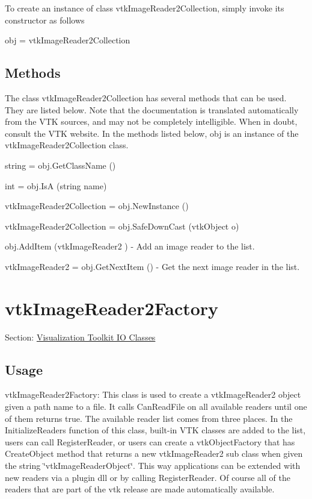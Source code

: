 To create an instance of class vtk\-Image\-Reader2\-Collection, simply invoke its constructor as follows \begin{DoxyVerb}  obj = vtkImageReader2Collection
\end{DoxyVerb}
 \hypertarget{vtkwidgets_vtkxyplotwidget_Methods}{}\subsection{Methods}\label{vtkwidgets_vtkxyplotwidget_Methods}
The class vtk\-Image\-Reader2\-Collection has several methods that can be used. They are listed below. Note that the documentation is translated automatically from the V\-T\-K sources, and may not be completely intelligible. When in doubt, consult the V\-T\-K website. In the methods listed below, {\ttfamily obj} is an instance of the vtk\-Image\-Reader2\-Collection class. 
\begin{DoxyItemize}
\item {\ttfamily string = obj.\-Get\-Class\-Name ()}  
\item {\ttfamily int = obj.\-Is\-A (string name)}  
\item {\ttfamily vtk\-Image\-Reader2\-Collection = obj.\-New\-Instance ()}  
\item {\ttfamily vtk\-Image\-Reader2\-Collection = obj.\-Safe\-Down\-Cast (vtk\-Object o)}  
\item {\ttfamily obj.\-Add\-Item (vtk\-Image\-Reader2 )} -\/ Add an image reader to the list.  
\item {\ttfamily vtk\-Image\-Reader2 = obj.\-Get\-Next\-Item ()} -\/ Get the next image reader in the list.  
\end{DoxyItemize}\hypertarget{vtkio_vtkimagereader2factory}{}\section{vtk\-Image\-Reader2\-Factory}\label{vtkio_vtkimagereader2factory}
Section\-: \hyperlink{sec_vtkio}{Visualization Toolkit I\-O Classes} \hypertarget{vtkwidgets_vtkxyplotwidget_Usage}{}\subsection{Usage}\label{vtkwidgets_vtkxyplotwidget_Usage}
vtk\-Image\-Reader2\-Factory\-: This class is used to create a vtk\-Image\-Reader2 object given a path name to a file. It calls Can\-Read\-File on all available readers until one of them returns true. The available reader list comes from three places. In the Initialize\-Readers function of this class, built-\/in V\-T\-K classes are added to the list, users can call Register\-Reader, or users can create a vtk\-Object\-Factory that has Create\-Object method that returns a new vtk\-Image\-Reader2 sub class when given the string \char`\"{}vtk\-Image\-Reader\-Object\char`\"{}. This way applications can be extended with new readers via a plugin dll or by calling Register\-Reader. Of course all of the readers that are part of the vtk release are made automatically available.

